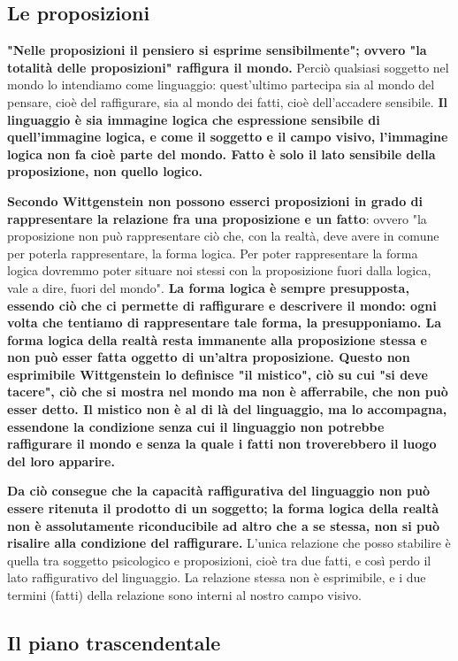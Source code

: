 \subsection{Le proposizioni}

\textbf{"Nelle proposizioni il pensiero si esprime
sensibilmente"; ovvero "la totalità delle
proposizioni" raffigura il mondo.} Perciò qualsiasi
soggetto nel mondo lo intendiamo come linguaggio:
quest'ultimo partecipa sia al mondo del pensare,
cioè del raffigurare, sia al mondo dei fatti, cioè
dell'accadere sensibile. \textbf{Il linguaggio è sia immagine
logica che espressione sensibile di quell'immagine
logica, e come il soggetto e il campo visivo, l'immagine logica non fa
cioè parte del mondo. Fatto è solo il lato sensibile
della proposizione, non quello logico.}

\textbf{Secondo Wittgenstein non possono esserci proposizioni
in grado di rappresentare la relazione fra una
proposizione e un fatto}: ovvero "la proposizione non
può rappresentare ciò che, con la realtà, deve avere
in comune per poterla rappresentare, la forma logica.
Per poter rappresentare la forma logica dovremmo
poter situare noi stessi con la proposizione fuori
dalla logica, vale a dire, fuori del mondo".
\textbf{La forma logica è sempre presupposta, essendo ciò
che ci permette di raffigurare e descrivere il
mondo: ogni volta che tentiamo di rappresentare
tale forma, la presupponiamo. La forma logica
della realtà resta immanente alla proposizione
stessa e non può esser fatta oggetto di un'altra
proposizione. Questo non esprimibile Wittgenstein
lo definisce "il mistico", ciò su cui "si deve
tacere", ciò che si mostra nel mondo ma non
è afferrabile, che non può esser detto.
Il mistico non è al di là del linguaggio, ma
lo accompagna, essendone la condizione senza
cui il linguaggio non potrebbe raffigurare il mondo
e senza la quale i fatti non troverebbero il luogo del loro
apparire.}

\textbf{Da ciò consegue che la capacità raffigurativa
del linguaggio non può essere ritenuta il
prodotto di un soggetto; la forma logica della
realtà non è assolutamente riconducibile ad
altro che a se stessa, non si può risalire
alla condizione del raffigurare.}
L'unica relazione che posso stabilire è quella
tra soggetto psicologico e proposizioni,
cioè tra due fatti, e così perdo il
lato raffigurativo del linguaggio.
La relazione stessa non è esprimibile, e i due
termini (fatti) della relazione sono interni
al nostro campo visivo.

\subsection{Il piano trascendentale}

